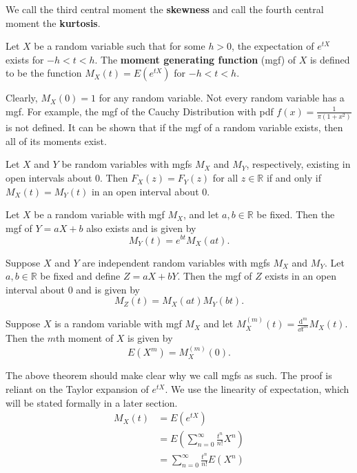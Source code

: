 We call the third central moment the \textbf{skewness} and call the fourth central moment the \textbf{kurtosis}.

\begin{definition}[mgf]
	Let $X$ be a random variable such that for some $h>0$, the expectation of $e^{tX}$ exists for $-h<t<h$. The \textbf{moment generating function} (mgf) of $X$ is defined to be the function $M_X(t)=E(e^{tX})$ for $-h<t<h$.
\end{definition}

Clearly, $M_X(0)=1$ for any random variable. Not every random variable has a mgf. For example, the mgf of the Cauchy Distribution with pdf $f(x)=\frac{1}{\pi(1+x^2)}$ is not defined. It can be shown that if the mgf of a random variable exists, then all of its moments exist.

\begin{theorem}[]
	Let $X$ and $Y$ be random variables with mgfs $M_X$ and $M_Y$, respectively, existing in open intervals about 0. Then $F_X(z)=F_Y(z)$ for all $z\in\mathbb R$ if and only if $M_X(t)=M_Y(t)$ in an open interval about 0.
\end{theorem}

\begin{theorem}[]
	Let $X$ be a random variable with mgf $M_X$, and let $a,b\in\mathbb R$ be fixed. Then the mgf of $Y=aX+b$ also exists and is given by $$M_Y(t)=e^{bt}M_X(at).$$
\end{theorem}

\begin{theorem}[]
	Suppose $X$ and $Y$ are independent random variables with mgfs $M_X$ and $M_Y$. Let $a,b\in\mathbb R$ be fixed and define $Z=aX+bY$. Then the mgf of $Z$ exists in an open interval about 0 and is given by
	$$M_Z(t)=M_X(at)M_Y(bt).$$
\end{theorem}

\begin{theorem}[]
	Suppose $X$ is a random variable with mgf $M_X$ and let $M_X^{(m)}(t)=\frac{\mathrm{d}^m}{\dd t^m}M_X(t)$. Then the $m$th moment of $X$ is given by $$E(X^m)=M_X^{(m)}(0).$$
\end{theorem}

The above theorem should make clear why we call mgfs as such. The proof is reliant on the Taylor expansion of $e^{tX}$. We use the linearity of expectation, which will be stated formally in a later section.
\begin{align*}
	M_X(t)&=E(e^{tX})\\
	&=E\left(\sum_{n=0}^\infty \frac{t^n}{n!}X^n\right)\\
	&=\sum_{n=0}^\infty \frac{t^n}{n!}E(X^n)
\end{align*}

